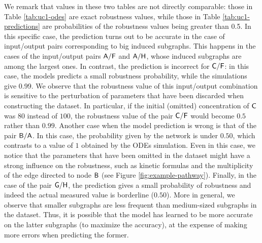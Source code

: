 We remark that values in these two tables are not directly comparable: those in Table \ref{tab:uc1-odes} are exact robustness values, while those in Table \ref{tab:uc1-predictions} are probabilities of the robustness values being greater than 0.5. In this specific case, the prediction turns out to be accurate in the case of input/output pairs corresponding to big induced subgraphs. This happens in the cases of the input/output pairs $\mathsf{A}/\mathsf{F}$ and $\mathsf{A}/\mathsf{H}$, whose induced subgraphs are among the largest ones. In contrast, the prediction is incorrect for $\mathsf{C}/\mathsf{F}$: in this case, the models predicts a small robustness probability, while the simulations give 0.99. We observe that the robustness value of this input/output combination is sensitive to the perturbation of parameters that have been discarded when constructing the dataset. In particular, if the initial (omitted) concentration of $\mathsf{C}$ was $80$ instead of $100$, the robustness value of the pair $\mathsf{C}/\mathsf{F}$ would become $0.5$ rather than $0.99$. Another case when the model prediction is wrong is that of the pair $\mathsf{B}/\mathsf{A}$. In this case, the probability given by the network is under $0.50$, which contrasts to a value of $1$ obtained by the ODEs simulation. Even in this case, we notice that the parameters that have been omitted in the dataset might have a strong influence on the robustness, such as kinetic formulas and the multiplicity of the edge directed to node $\mathsf{B}$ (see Figure \ref{fig:example-pathway}). Finally, in the case of the pair $\mathsf{G}/\mathsf{H}$, the prediction gives a small probability of robustness and indeed the actual measured value is borderline ($0.50$). More in general, we observe that smaller subgraphs are less frequent than medium-sized subgraphs in the dataset. Thus, it is possible that the model has learned to be more accurate on the latter subgraphs (to maximize the accuracy), at the expense of making more errors when predicting the former.

